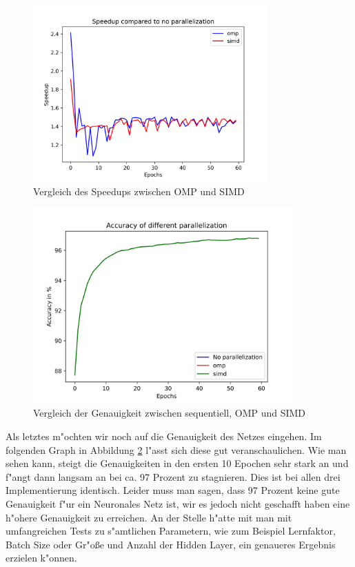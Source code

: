 \documentclass[12pt,a4paper]{scrartcl}
\begin{document}
\begin{figure}[h]
	\centering
	\includegraphics[width=9cm]{graphs/speedup_single.png}
	\caption{Vergleich des Speedups zwischen OMP und SIMD} \label{speedup single}
\end{figure}



\begin{figure}[h]
	\centering
	\includegraphics[width=10cm]{graphs/accuracy_single.png}
	\caption{Vergleich der Genauigkeit zwischen sequentiell, OMP und SIMD} \label{accuracy single}
\end{figure}
Als letztes m"ochten wir noch auf die Genauigkeit des Netzes eingehen. Im folgenden Graph in Abbildung \ref{accuracy single} l"asst sich diese gut veranschaulichen. Wie man sehen kann, steigt die Genauigkeiten in den ersten 10 Epochen sehr stark an und f"angt dann langsam an bei ca. 97 Prozent zu stagnieren. Dies ist bei allen drei Implementierung identisch. Leider muss man sagen, dass 97 Prozent keine gute Genauigkeit f"ur ein Neuronales Netz ist, wir es jedoch nicht geschafft haben eine h"ohere Genauigkeit zu erreichen. An der Stelle h"atte mit man mit umfangreichen Tests zu s"amtlichen Parametern, wie zum Beispiel Lernfaktor, Batch Size oder Gr"o\ss e und Anzahl der Hidden Layer, ein genaueres Ergebnis erzielen k"onnen. \\
\end{document}
